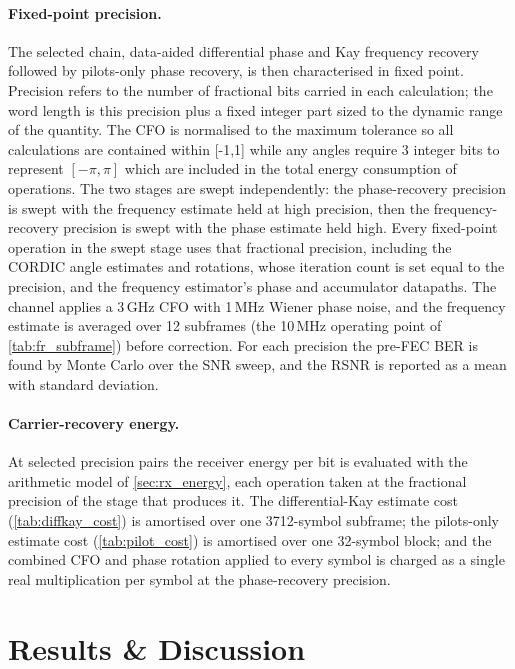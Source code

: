 \documentclass[12pt,a4paper]{report}
\begin{document}
\paragraph{Fixed-point precision.} The selected chain, data-aided differential phase and Kay frequency recovery followed by pilots-only phase recovery, is then characterised in fixed point. Precision refers to the number of fractional bits carried in each calculation; the word length is this precision plus a fixed integer part sized to the dynamic range of the quantity. The CFO is normalised to the maximum tolerance so all calculations are contained within [-1,1] while any angles require 3 integer bits to represent $[-\pi, \pi]$ which are included in the total energy consumption of operations. The two stages are swept independently: the phase-recovery precision is swept with the frequency estimate held at high precision, then the frequency-recovery precision is swept with the phase estimate held high. Every fixed-point operation in the swept stage uses that fractional precision, including the CORDIC angle estimates and rotations, whose iteration count is set equal to the precision, and the frequency estimator's phase and accumulator datapaths. The channel applies a 3\,GHz CFO with 1\,MHz Wiener phase noise, and the frequency estimate is averaged over 12 subframes (the 10\,MHz operating point of \cref{tab:fr_subframe}) before correction. For each precision the pre-FEC BER is found by Monte Carlo over the SNR sweep, and the RSNR is reported as a mean with standard deviation.

\paragraph{Carrier-recovery energy.} At selected precision pairs the receiver energy per bit is evaluated with the arithmetic model of \cref{sec:rx_energy}, each operation taken at the fractional precision of the stage that produces it. The differential-Kay estimate cost (\cref{tab:diffkay_cost}) is amortised over one 3712-symbol subframe; the pilots-only estimate cost (\cref{tab:pilot_cost}) is amortised over one 32-symbol block; and the combined CFO and phase rotation applied to every symbol is charged as a single real multiplication per symbol at the phase-recovery precision.

\section{Results \& Discussion}
\end{document}
